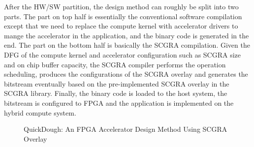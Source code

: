 After the HW/SW partition, the design method can roughly be split into two parts. The part on top half is essentially the conventional software compilation except that we need to replace the compute kernel with accelerator drivers to mange the accelerator in the application, and the binary code is generated in the end. The part on the bottom half is basically the SCGRA compilation. Given the DFG of the compute kernel and accelerator configuration such as SCGRA size and on chip buffer capacity, the SCGRA compiler performs the operation scheduling, produces the configurations of the SCGRA overlay and generates the bitstream eventually based on the pre-implemented SCGRA overlay in the SCGRA library. Finally, the binary code is loaded to the host system, the bitstream is configured to FPGA and the application is implemented on the hybrid compute system. 

\begin{figure}[H]
    \caption{QuickDough: An FPGA Accelerator Design Method Using SCGRA Overlay}
    \label{fig:framework}
\end{figure}

